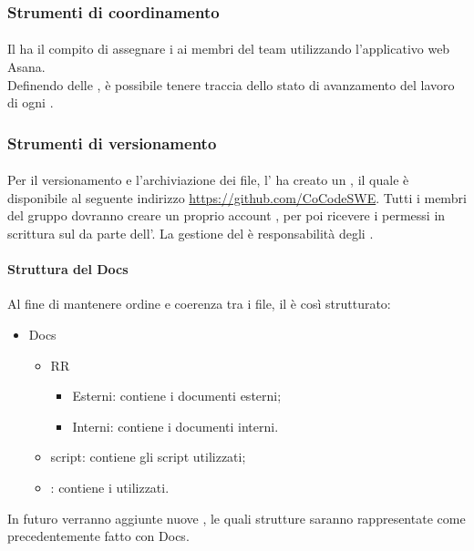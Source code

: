 \subsubsection{Strumenti di coordinamento}
 \paragraph{}
 Il \RESP{} ha il compito di assegnare i  ai membri del team utilizzando l'applicativo web Asana. \\
 Definendo delle , è possibile tenere traccia dello stato di avanzamento del lavoro di ogni .
 
\subsubsection{Strumenti di versionamento}
 \paragraph{}
 Per il versionamento e l'archiviazione dei file, l'\AMM{} ha creato un  , il quale è disponibile al seguente indirizzo \url{https://github.com/CoCodeSWE}. Tutti i membri del gruppo dovranno creare un proprio account , per poi ricevere i permessi in scrittura sul  da parte dell'\AMM.
 La gestione del  è responsabilità degli \AMMP.
 \paragraph{Struttura del  Docs}
 Al fine di mantenere ordine e coerenza tra i file, il  è così strutturato:
 \begin{itemize}
  \item Docs
   \begin{itemize}
    \item RR
     \begin{itemize}
      \item Esterni: contiene i documenti esterni;
      \item Interni: contiene i documenti interni.
     \end{itemize}
     \item script: contiene gli script utilizzati;
     \item {}: contiene i  utilizzati.
    \end{itemize}
   \end{itemize}
In futuro verranno aggiunte nuove , le quali strutture saranno rappresentate come precedentemente fatto con Docs.
